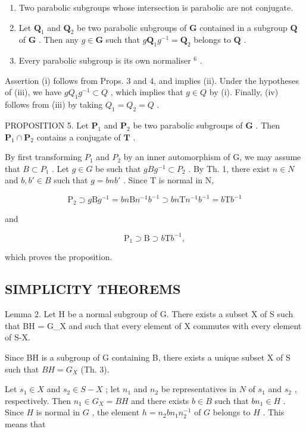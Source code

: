 \begin{enumerate}
\def\labelenumi{(\roman{enumi})}
\setcounter{enumi}{1}
\item
  Two parabolic subgroups whose intersection is parabolic are not conjugate.
\item
  Let \(\mathbf{Q}_1\) and \(\mathbf{Q}_2\) be two parabolic subgroups of \(\mathbf{G}\) contained in a subgroup \(\mathbf{Q}\) of \(\mathbf{G}\) . Then any \(g \in \mathbf{G}\) such that \(g\mathbf{Q}_1g^{-1} = \mathbf{Q}_2\) belongs to \(\mathbf{Q}\) .
\item
  Every parabolic subgroup is its own normaliser \(^{6}\) .
\end{enumerate}

Assertion (i) follows from Props. 3 and 4, and implies (ii). Under the hypotheses of (iii), we have \(gQ_{1}g^{-1} \subset Q\) , which implies that \(g \in Q\) by (i). Finally, (iv) follows from (iii) by taking \(Q_{1} = Q_{2} = Q\) .

PROPOSITION 5. Let \(\mathbf{P}_1\) and \(\mathbf{P}_2\) be two parabolic subgroups of \(\mathbf{G}\) . Then \(\mathbf{P}_1 \cap \mathbf{P}_2\) contains a conjugate of \(\mathbf{T}\) .

By first transforming \(P_{1}\) and \(P_{2}\) by an inner automorphism of G, we may assume that \(B \subset P_{1}\) . Let \(g \in G\) be such that \(gBg^{-1} \subset P_{2}\) . By Th. 1, there exist \(n \in N\) and \(b, b' \in B\) such that \(g = bnb'\) . Since T is normal in N,

\[
\mathrm{P} _ {2} \supset g \mathrm{B} g ^ {- 1} = b n \mathrm{B} n ^ {- 1} b ^ {- 1} \supset b n \mathrm{T} n ^ {- 1} b ^ {- 1} = b \mathrm{T} b ^ {- 1}
\]

and

\[
\mathrm{P} _ {1} \supset \mathrm{B} \supset b \mathrm{T} b ^ {- 1},
\]

which proves the proposition.

\subsection{SIMPLICITY THEOREMS}

Lemma 2. Let H be a normal subgroup of G. There exists a subset X of S such that BH = G\_X and such that every element of X commutes with every element of S-X.

Since BH is a subgroup of G containing B, there exists a unique subset X of S such that \(BH = G_{X}\) (Th. 3).

Let \(s_1 \in X\) and \(s_2 \in S - X\) ; let \(n_1\) and \(n_2\) be representatives in \(N\) of \(s_1\) and \(s_2\) , respectively. Then \(n_1 \in G_X = BH\) and there exists \(b \in B\) such that \(bn_1 \in H\) . Since \(H\) is normal in \(G\) , the element \(h = n_2bn_1n_2^{-1}\) of \(G\) belongs to \(H\) . This means that

